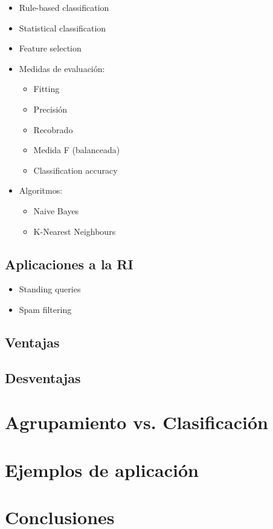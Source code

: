 \documentclass{llncs}
\begin{document}
\begin{itemize}
\item Rule-based classification

\item Statistical classification

\item Feature selection

\item Medidas de evaluaci\'on:
\begin{itemize}
	\item Fitting
	\item Precisi\'on
	\item Recobrado
	\item Medida F (balanceada)
	\item Classification accuracy
\end{itemize}

\item Algoritmos:
\begin{itemize}
	\item Naive Bayes
	
	
	\item K-Nearest Neighbours
\end{itemize}
\end{itemize}

\subsection{Aplicaciones a la RI}
\begin{itemize}
	\item Standing queries
	\item Spam filtering
\end{itemize}

\subsection{Ventajas} 

\subsection{Desventajas}

\section{Agrupamiento vs. Clasificaci\'on}

\section{Ejemplos de aplicación}

\section{Conclusiones}
\end{document}
